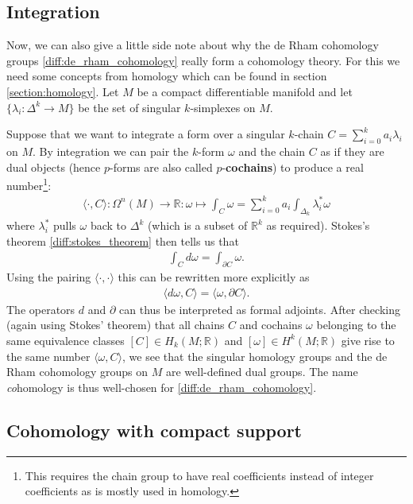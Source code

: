 \subsection{Integration}

    Now, we can also give a little side note about why the de Rham cohomology groups \ref{diff:de_rham_cohomology} really form a cohomology theory. For this we need some concepts from homology which can be found in section \ref{section:homology}. Let $M$ be a compact differentiable manifold and let $\{\lambda_i:\Delta^k\rightarrow M\}$ be the set of singular $k$-simplexes on $M$.

    Suppose that we want to integrate a form over a singular $k$-chain $C = \sum_{i=0}^ka_i\lambda_i$ on $M$. By integration we can pair the $k$-form $\omega$ and the chain $C$ as if they are dual objects (hence $p$-forms are also called $p$-\textbf{cochains}) to produce a real number\footnote{This requires the chain group to have real coefficients instead of integer coefficients as is mostly used in homology.}:
    \begin{gather}
        \langle\cdot,C\rangle:\Omega^n(M)\rightarrow\mathbb{R}:\omega\mapsto\int_C\omega = \sum_{i=0}^ka_i\int_{\Delta_k}\lambda_i^{*}\omega
    \end{gather}
    where $\lambda_i^*$ pulls $\omega$ back to $\Delta^k$ (which is a subset of $\mathbb{R}^k$ as required). Stokes's theorem \ref{diff:stokes_theorem} then tells us that
    \begin{gather}
        \int_Cd\omega = \int_{\partial C}\omega.
    \end{gather}
    Using the pairing $\langle\cdot,\cdot\rangle$ this can be rewritten more explicitly as
    \begin{gather}
        \langle d\omega, C\rangle = \langle \omega, \partial C\rangle.
    \end{gather}
    The operators $d$ and $\partial$ can thus be interpreted as formal adjoints. After checking (again using Stokes' theorem) that all chains $C$ and cochains $\omega$ belonging to the same equivalence classes $[C]\in H_k(M; \mathbb{R})$ and $[\omega]\in H^k(M; \mathbb{R})$ give rise to the same number $\langle\omega, C\rangle$, we see that the singular homology groups and the de Rham cohomology groups on $M$ are well-defined dual groups. The name \textit{co}homology is thus well-chosen for \ref{diff:de_rham_cohomology}.

\subsection{Cohomology with compact support}

